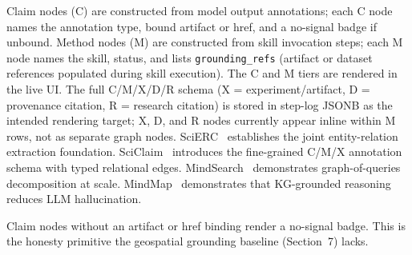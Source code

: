 \eqcmxgraph Claim nodes (C) are constructed from model output annotations; each C node names the annotation type, bound artifact or href, and a no-signal badge if unbound. Method nodes (M) are constructed from skill invocation steps; each M node names the skill, status, and lists \texttt{grounding\_refs} (artifact or dataset references populated during skill execution). The C and M tiers are rendered in the live UI. The full C/M/X/D/R schema (X = experiment/artifact, D = provenance citation, R = research citation) is stored in step-log JSONB as the intended rendering target; X, D, and R nodes currently appear inline within M rows, not as separate graph nodes. SciERC~\cite{arxiv180809602} establishes the joint entity-relation extraction foundation. SciClaim~\cite{arxiv210910453} introduces the fine-grained C/M/X annotation schema with typed relational edges. MindSearch~\cite{arxiv240720183} demonstrates graph-of-queries decomposition at scale. MindMap~\cite{arxiv230809729} demonstrates that KG-grounded reasoning reduces LLM hallucination.

Claim nodes without an artifact or href binding render a no-signal badge. This is the honesty primitive the geospatial grounding baseline (Section~7) lacks.
